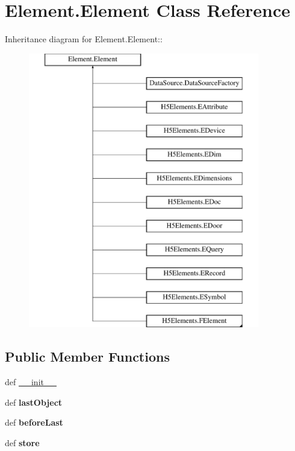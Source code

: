 \hypertarget{classElement_1_1Element}{
\section{Element.Element Class Reference}
\label{classElement_1_1Element}
}
Inheritance diagram for Element.Element::\begin{figure}[H]
\begin{center}
\leavevmode
\includegraphics[height=12cm]{classElement_1_1Element}
\end{center}
\end{figure}
\subsection*{Public Member Functions}
\begin{DoxyCompactItemize}
\item 
def \hyperlink{classElement_1_1Element_a359371465b7c4d21611adec7e86c3b33}{\_\-\_\-init\_\-\_\-}
\item 
\hypertarget{classElement_1_1Element_a44825d29e1f59b7c8f0ebe7710df530e}{
def {\bfseries lastObject}}
\label{classElement_1_1Element_a44825d29e1f59b7c8f0ebe7710df530e}

\item 
\hypertarget{classElement_1_1Element_a5e75dc810e645f7f2411d10e7b1db0f3}{
def {\bfseries beforeLast}}
\label{classElement_1_1Element_a5e75dc810e645f7f2411d10e7b1db0f3}

\item 
\hypertarget{classElement_1_1Element_a382e33855f5875d4d56af8249ceb2cff}{
def {\bfseries store}}
\label{classElement_1_1Element_a382e33855f5875d4d56af8249ceb2cff}

\end{DoxyCompactItemize}
